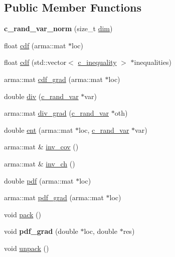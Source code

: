 \subsection*{\-Public \-Member \-Functions}
\begin{DoxyCompactItemize}
\item 
\hypertarget{classdivopt_1_1c__rand__var__norm_a5482c2914b51e7838eebea1df9da5255}{{\bfseries c\-\_\-rand\-\_\-var\-\_\-norm} (size\-\_\-t \hyperlink{classdivopt_1_1c__rand__var_ad263b31b0e272d1c00a7368362ed19e4}{dim})}\label{classdivopt_1_1c__rand__var__norm_a5482c2914b51e7838eebea1df9da5255}

\item 
float \hyperlink{classdivopt_1_1c__rand__var__norm_acf9741d640440ebf2b216ef6941a423e}{cdf} (arma\-::mat $\ast$loc)
\item 
float \hyperlink{classdivopt_1_1c__rand__var__norm_a96006e8533878fcc4e60e4eaca636d7b}{cdf} (std\-::vector$<$ \hyperlink{classdivopt_1_1c__inequality}{c\-\_\-inequality} $>$ $\ast$inequalities)
\item 
arma\-::mat \hyperlink{classdivopt_1_1c__rand__var__norm_af3cdc507ce57431b8e7adf31d9d43b25}{cdf\-\_\-grad} (arma\-::mat $\ast$loc)
\item 
double \hyperlink{classdivopt_1_1c__rand__var__norm_abdf1ec21f17eb4d67e48603550f3e134}{div} (\hyperlink{classdivopt_1_1c__rand__var}{c\-\_\-rand\-\_\-var} $\ast$var)
\item 
arma\-::mat \hyperlink{classdivopt_1_1c__rand__var__norm_af6c8d8d58ab0a0e9e18d09ea610aa346}{div\-\_\-grad} (\hyperlink{classdivopt_1_1c__rand__var}{c\-\_\-rand\-\_\-var} $\ast$oth)
\item 
double \hyperlink{classdivopt_1_1c__rand__var__norm_afdb198ee63254712f7c6aa0021a30ca9}{ent} (arma\-::mat $\ast$loc, \hyperlink{classdivopt_1_1c__rand__var}{c\-\_\-rand\-\_\-var} $\ast$var)
\item 
arma\-::mat \& \hyperlink{classdivopt_1_1c__rand__var__norm_a1c776a9aacc027a948e17099c8304395}{inv\-\_\-cov} ()
\item 
arma\-::mat \& \hyperlink{classdivopt_1_1c__rand__var__norm_a160d8b98203d30649a09ed4ffdea8bb9}{inv\-\_\-ch} ()
\item 
double \hyperlink{classdivopt_1_1c__rand__var__norm_a4b2bec9177f3e1ba8e7b3a212a6138b7}{pdf} (arma\-::mat $\ast$loc)
\item 
arma\-::mat \hyperlink{classdivopt_1_1c__rand__var__norm_ae6de55fcebe4d49d010e76943b53eb23}{pdf\-\_\-grad} (arma\-::mat $\ast$loc)
\item 
void \hyperlink{classdivopt_1_1c__rand__var__norm_aa132723e7b1639d39649042c84afe703}{pack} ()
\item 
\hypertarget{classdivopt_1_1c__rand__var__norm_a0d47dc64e53a79a05e8f3ce476ab8cb8}{void {\bfseries pdf\-\_\-grad} (double $\ast$loc, double $\ast$res)}\label{classdivopt_1_1c__rand__var__norm_a0d47dc64e53a79a05e8f3ce476ab8cb8}

\item 
void \hyperlink{classdivopt_1_1c__rand__var__norm_a74609f0002a3d05501ef3a3896938669}{unpack} ()
\end{DoxyCompactItemize}
